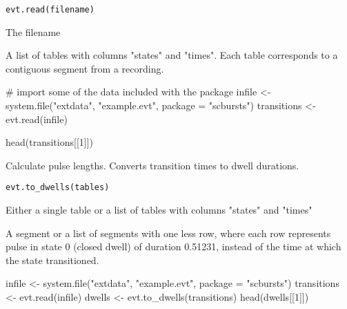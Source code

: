 \documentclass[letterpaper]{book}
\begin{document}
%
\begin{Usage}
\begin{verbatim}
evt.read(filename)
\end{verbatim}
\end{Usage}
%
\begin{Arguments}
\begin{ldescription}
\item[\code{filename}] The filename
\end{ldescription}
\end{Arguments}
%
\begin{Value}
A list of tables with columns "states" and "times".
Each table corresponds to a contiguous segment from a recording.
\end{Value}
%
\begin{Examples}
\begin{ExampleCode}

# import some of the data included with the package
infile <- system.file("extdata", "example.evt", package = "scbursts")
transitions <- evt.read(infile)

head(transitions[[1]])

\end{ExampleCode}
\end{Examples}
%
\begin{Description}\relax
Calculate pulse lengths. Converts transition times to dwell durations.
\end{Description}
%
\begin{Usage}
\begin{verbatim}
evt.to_dwells(tables)
\end{verbatim}
\end{Usage}
%
\begin{Arguments}
\begin{ldescription}
\item[\code{tables}] Either a single table or a list of tables with columns "states" and "times"
\end{ldescription}
\end{Arguments}
%
\begin{Value}
A segment or a list of segments with one less row, where each row
represents pulse in state 0 (closed dwell) of duration 0.51231, instead
of the time at which the state transitioned.
\end{Value}
%
\begin{Examples}
\begin{ExampleCode}

infile <- system.file("extdata", "example.evt", package = "scbursts")
transitions <- evt.read(infile)
dwells <- evt.to_dwells(transitions)
head(dwells[[1]])

\end{ExampleCode}
\end{Examples}
\end{document}
